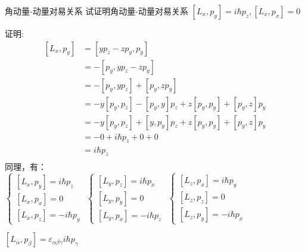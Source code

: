 \begin{frame} [allowframebreaks=]
    \frametitle{}
    \begin{tcolorbox1}{角动量-动量对易关系}
        试证明角动量-动量对易关系 $[L_x,p_y]=i\hbar p_z,  [L_x,p_x]=0$
    \end{tcolorbox1}
    \alert{证明:} 
    \begin{equation*}
        \begin{split}
        [L_x,p_y]&= [yp_z-zp_y,p_y]\\
        &=-[p_y,yp_z-zp_y]\\
        &=-[p_y,yp_z] + [p_y,zp_y]\\
        &=-y[p_y,p_z] -[p_y,y]p_z + z[p_y,p_y] + [p_y,z]p_y\\
        &=-y[p_y,p_z] +[y,p_y]p_z + z[p_y,p_y] + [p_y,z]p_y\\
        &=-0 + i\hbar p_z + 0+0\\
        &=i\hbar p_z \\
        \end{split}  
    \end{equation*}
    同理，有：\\
    $\begin{cases}
        [L_x,p_y]= i\hbar p_z  \\ 
        [L_x,p_x]= 0  \\ 
        [L_x,p_z]= -i\hbar p_y 
    \end{cases}$
    $\begin{cases}
        [L_y,p_z]= i\hbar p_x  \\ 
        [L_y,p_y]= 0  \\ 
        [L_y,p_x]= -i\hbar p_z 
    \end{cases}$
    $\begin{cases}
        [L_z,p_x]= i\hbar p_y  \\ 
        [L_z,p_z]= 0  \\ 
        [L_z,p_y]= -i\hbar p_x 
    \end{cases}$
    \begin{tcolorbox4}
        $ [L_\alpha,p_\beta]= \varepsilon_{\alpha\beta\gamma} i\hbar p_\gamma $
    \end{tcolorbox4}
\end{frame} 

